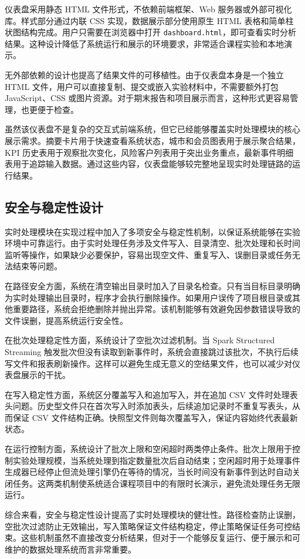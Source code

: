 \documentclass[12pt,hyperref,a4paper,UTF8]{ctexart}
\begin{document}
仪表盘采用静态 HTML 文件形式，不依赖前端框架、Web 服务器或外部可视化库。样式部分通过内联 CSS 实现，数据展示部分使用原生 HTML 表格和简单柱状图结构完成。用户只需要在浏览器中打开 \texttt{dashboard.html}，即可查看实时分析结果。这种设计降低了系统运行和展示的环境要求，非常适合课程实验和本地演示。

无外部依赖的设计也提高了结果文件的可移植性。由于仪表盘本身是一个独立 HTML 文件，用户可以直接复制、提交或嵌入实验材料中，不需要额外打包 JavaScript、CSS 或图片资源。对于期末报告和项目展示而言，这种形式更容易管理，也更便于检查。

虽然该仪表盘不是复杂的交互式前端系统，但它已经能够覆盖实时处理模块的核心展示需求。摘要卡片用于快速查看系统状态，城市和会员图表用于展示聚合结果，KPI 历史表用于观察批次变化，风险客户列表用于突出业务重点，最新事件明细表用于追踪输入数据。通过这些内容，仪表盘能够较完整地呈现实时处理链路的运行结果。

\subsection{安全与稳定性设计}

实时处理模块在实现过程中加入了多项安全与稳定性机制，以保证系统能够在实验环境中可靠运行。由于实时处理任务涉及文件写入、目录清空、批次处理和长时间监听等操作，如果缺少必要保护，容易出现空文件、重复写入、误删目录或任务无法结束等问题。

在路径安全方面，系统在清空输出目录时加入了目录名检查。只有当目标目录明确为实时处理输出目录时，程序才会执行删除操作。如果用户误传了项目根目录或其他重要路径，系统会拒绝删除并抛出异常。该机制能够有效避免因参数错误导致的文件误删，提高系统运行安全性。

在批次处理稳定性方面，系统设计了空批次过滤机制。当 Spark Structured Streaming 触发批次但没有读取到新事件时，系统会直接跳过该批次，不执行后续写文件和报表刷新操作。这样可以避免生成无意义的空结果文件，也可以减少对仪表盘展示的干扰。

在写入稳定性方面，系统区分覆盖写入和追加写入，并在追加 CSV 文件时处理表头问题。历史型文件只在首次写入时添加表头，后续追加记录时不重复写表头，从而保证 CSV 文件结构正确。快照型文件则每次覆盖写入，保证内容始终代表最新状态。

在运行控制方面，系统设计了批次上限和空闲超时两类停止条件。批次上限用于控制实验处理规模，当系统处理到指定数量批次后自动结束；空闲超时用于处理事件生成器已经停止但流处理引擎仍在等待的情况，当长时间没有新事件到达时自动关闭任务。这两类机制使系统适合课程项目中的有限时长演示，避免流处理任务无限运行。

综合来看，安全与稳定性设计提高了实时处理模块的健壮性。路径检查防止误删，空批次过滤防止无效输出，写入策略保证文件结构稳定，停止策略保证任务可控结束。这些机制虽然不直接改变分析结果，但对于一个能够反复运行、便于展示和可维护的数据处理系统而言非常重要。
\end{document}

